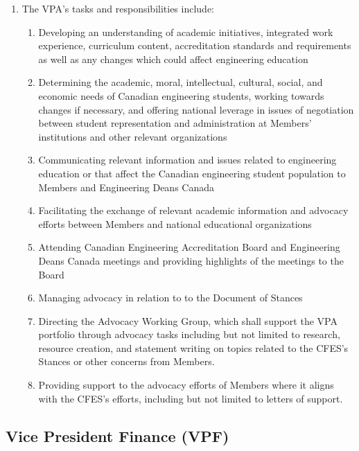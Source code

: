 \begin{enumerate}
 \item The VPA’s tasks and responsibilities include:
  \begin{enumerate}
   \item Developing an understanding of academic initiatives, integrated work experience, curriculum content, accreditation standards and requirements as well as any changes which could affect engineering education
   \item Determining the academic, moral, intellectual, cultural, social, and economic needs of Canadian engineering students, working towards changes if necessary, and offering national leverage in issues of negotiation between student representation and administration at Members’ institutions and other relevant organizations
   \item Communicating relevant information and issues related to engineering education or that affect the Canadian engineering student population to Members and Engineering Deans Canada
   \item Facilitating the exchange of relevant academic information and advocacy efforts between Members and national educational organizations
   \item Attending Canadian Engineering Accreditation Board and Engineering Deans Canada meetings and providing highlights of the meetings to the Board
   \item Managing advocacy in relation to to the Document of Stances
   \item Directing the Advocacy Working Group, which shall support the VPA portfolio through advocacy tasks including but not limited to research, resource creation, and statement writing on topics related to the CFES's Stances or other concerns from Members.
   \item Providing support to the advocacy efforts of Members where it aligns with the CFES’s efforts, including but not limited to letters of support.
  \end{enumerate}
\end{enumerate}

\subsection{Vice President Finance (VPF)}
\label{national-executive-vice-president-finance-vpf}

